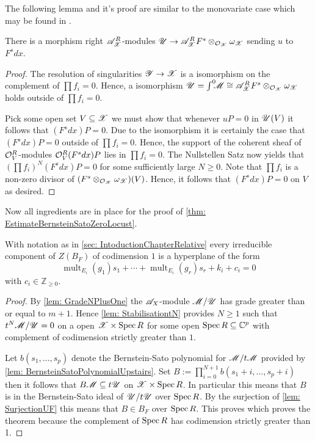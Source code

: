 The following lemma and it's proof are similar to the monovariate case which may be found in \cite[p246]{bjork1979rings}.
\begin{lemma}\label{lem: SurjectionUF}
  There is a morphism right $\mathscr{A}_{\mathscr{X}}^R$-modules $\mathscr{U}\to \mathscr{A}_{\mathscr{X}}^RF^s \otimes_{\mathcal{O}_{\mathscr{X}}}\omega_{\mathscr{X}}$ sending $u$ to $F^sdx$.
\end{lemma}
\begin{proof}
   The resolution of singularities $\mathscr{Y}\to \mathscr{X}$ is a isomorphism on the complement of $\prod f_i = 0$. Hence, a isomorphism $\mathscr{U} = \int^0 \mkern -8mu \mathscr{M} \cong  \mathscr{A}_{\mathscr{X}}^RF^s  \otimes_{\mathcal{O}_{\mathscr{X}}}\omega_{\mathscr{X}}$ holds outside of $\prod f_i = 0$.

  Pick some open set $V\subseteq \mathscr{X}$ we must show that whenever $uP = 0$ in $\mathscr{U}(V)$ it follows that $(F^s dx)P = 0$.
  Due to the isomorphism it is certainly the case that $(F^s dx) P = 0$ outside of $\prod f_i = 0$.
  Hence, the support of the coherent sheaf of $\mathcal{O}_V^R$-modules $\mathcal{O}_V^R (F^s dx) P $ lies in $\prod f_i = 0$.
  The Nullstellen Satz now yields that $(\prod f_i)^N (F^s dx) P  = 0$ for some sufficiently large $N\geq 0$.
  Note that $\prod f_i$ is a non-zero divisor of $(F^s\otimes_{\mathcal{O}_{\mathscr{X}}} \omega_{\mathscr{X}})(V)$. Hence, it follows that $(F^s dx) P= 0$ on $V$ as desired.
\end{proof}
Now all ingredients are in place for the proof of \cref{thm: EstimateBernsteinSatoZeroLocust}.
\begin{theorem}
  With notation as in \cref{sec: IntoductionChapterRelative} every irreducible component of $Z(B_F)$ of codimension $1$ is a hyperplane of the form
  $$\operatorname{mult}_{E_i}(g_1) s_1 + \cdots + \operatorname{mult}_{E_i}(g_r)s_r + k_i + c_i=0$$
  with $c_i \in \mathbb{Z}_{\geq 0 }$.
\end{theorem}
\begin{proof}
  By \cref{lem: GradeNPlusOne} the $\mathscr{A}_X$-module $\mathscr{M}/\mathscr{U}$ has grade greater than or equal to $m + 1$. Hence \cref{lem: StabilisationtN} provides $N\geq 1$ such that $t^N\mathscr{M}/\mathscr{U} = 0$ on a open $\mathscr{X}\times\operatorname{Spec} R$ for some open $\operatorname{Spec} R\subseteq \mathbb{C}^p$ with complement of codimension strictly greater than $1$.

  Let $b(s_1,\ldots,s_p)$ denote the Bernstein-Sato polynomial for $\mathscr{M}/t\mathscr{M}$ provided by \cref{lem: BernsteinSatoPolynomialUpstairs}.
  Set $B := \prod_{i=0}^{N+1} b(s_1 + i, \ldots, s_p + i)$ then it follows that
  $B\mathscr{M} \subseteq t\mathscr{U}$ on $\mathscr{X} \times \operatorname{Spec} R$.
  In particular this means that $B$ is in the Bernstein-Sato ideal of $\mathscr{U}/t\mathscr{U}$ over $\operatorname{Spec} R$.
  By the surjection of \cref{lem: SurjectionUF} this means that $B\in B_F$ over $\operatorname{Spec} R$. This proves which proves the theorem because the complement of $\operatorname{Spec} R$ has codimension strictly greater than 1.
\end{proof}
